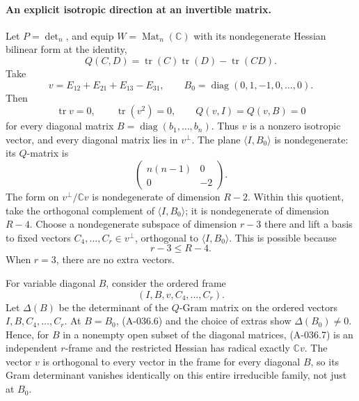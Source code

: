 \paragraph{An explicit isotropic direction at an invertible matrix.}
Let \(P=\det_n\), and equip \(W=\operatorname{Mat}_n(\mathbb C)\)
with its nondegenerate Hessian bilinear form at the identity,
\[
             Q(C,D)=\operatorname{tr}(C)\operatorname{tr}(D)
                                          -\operatorname{tr}(CD).
                                                               \tag{A-036.4}
\]
Take
\[
 v=E_{12}+E_{21}+E_{13}-E_{31},\qquad
 B_0=\operatorname{diag}(0,1,-1,0,\ldots,0).
                                                               \tag{A-036.5}
\]
Then
\[
 \operatorname{tr}v=0,\qquad \operatorname{tr}(v^2)=0,\qquad
 Q(v,I)=Q(v,B)=0
 \]
for every diagonal matrix \(B=\operatorname{diag}(b_1,\ldots,b_n)\).
Thus \(v\) is a nonzero isotropic vector, and every
diagonal matrix lies in \(v^\perp\).
The plane \(\langle I,B_0\rangle\) is nondegenerate:
its \(Q\)-matrix is
\[
                         \begin{pmatrix}n(n-1)&0\\0&-2\end{pmatrix}.
                                                               \tag{A-036.6}
\]
The form on \(v^\perp/\mathbb Cv\) is nondegenerate
of dimension \(R-2\). Within this quotient, take the
orthogonal complement of \(\langle I,B_0\rangle\);
it is nondegenerate of dimension \(R-4\).
Choose a nondegenerate subspace of dimension \(r-3\)
there and lift a basis to fixed vectors
\(C_4,\ldots,C_r\in v^\perp\), orthogonal to
\(\langle I,B_0\rangle\).
This is possible because
\[
                              r-3\leq R-4.
\]
When \(r=3\), there are no extra vectors.

For variable diagonal \(B\), consider the ordered frame
\[
                         (I,B,v,C_4,\ldots,C_r).
                                                               \tag{A-036.7}
\]
Let \(\Delta(B)\) be the determinant of the \(Q\)-Gram
matrix on the ordered vectors \(I,B,C_4,\ldots,C_r\).
At \(B=B_0\), (A-036.6) and the choice of extras show
\(\Delta(B_0)\ne0\).
Hence, for \(B\) in a nonempty open subset of the
diagonal matrices, (A-036.7) is an independent
\(r\)-frame and the restricted Hessian has radical
exactly \(\mathbb Cv\).
The vector \(v\) is orthogonal to every vector in
the frame for every diagonal \(B\), so its Gram
determinant vanishes identically on this entire
irreducible family, not just at \(B_0\).

